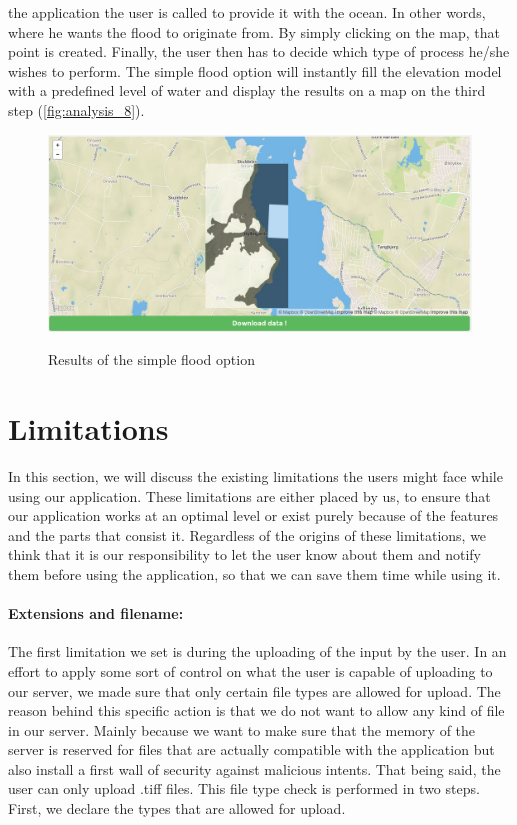 the application the user is called to provide it with the ocean. In other words, where he wants the flood to originate from. By simply clicking on the map, that point is created. 
Finally, the user then has to decide which type of process he/she wishes to perform. The simple flood option will instantly fill the elevation model with a predefined level of water and display the results on a map on the third step (\autoref{fig:analysis_8}).

\begin{figure}[t]
\centering
	{\includegraphics[width=\linewidth]{gfx/Analysis_Website/8.png}}
\caption{Results of the simple flood option}
\label{fig:analysis_8}
\end{figure}

\section{Limitations}
In this section, we will discuss the existing limitations the users might face while using our application. These limitations are either placed by us, to ensure that our application works at an optimal level or exist purely because of the features and the parts that consist it. Regardless of the origins of these limitations, we think that it is our responsibility to let the user know about them and notify them before using the application, so that we can save them time while using it.

\paragraph{Extensions and filename:} The first limitation we set is during the uploading of the input by the user. In an effort to apply some sort of control on what the user is capable of uploading to our server, we made sure that only certain file types are allowed for upload. The reason behind this specific action is that we do not want to allow any kind of file in our server. Mainly because we want to make sure that the memory of the server is reserved for files that are actually compatible with the application but also install a first wall of security against malicious intents. That being said, the user can only upload .tiff files. This file type check is performed in two steps. First, we declare the types that are allowed for upload.


